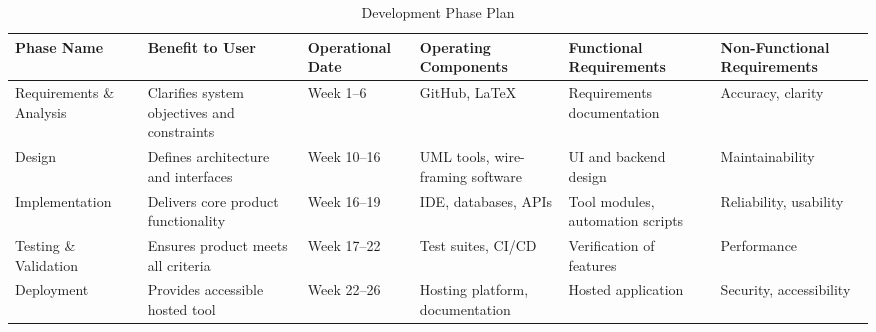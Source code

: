 \documentclass[12pt]{article}
\newcommand{\lips}{\textit{Insert your content here.}}
\begin{document}
\begin{table}[H]
\centering
\caption{Development Phase Plan}
\begin{tabularx}{\textwidth}{|p{2.5cm}|X|p{2cm}|X|X|X|}
\hline
\textbf{Phase Name} & \textbf{Benefit to User} & \textbf{Operational Date} & \textbf{Operating Components} & \textbf{Functional Requirements} & \textbf{Non-Functional Requirements} \\ \hline
Requirements \& Analysis & Clarifies system objectives and constraints & Week 1–6 & GitHub, LaTeX & Requirements documentation & Accuracy, clarity \\ \hline
Design & Defines architecture and interfaces & Week 10–16 & UML tools, wire-framing software & UI and backend design & Maintainability \\ \hline
Implementation & Delivers core product functionality & Week 16–19 & IDE, databases, APIs & Tool modules, automation scripts & Reliability, usability \\ \hline
Testing \& Validation & Ensures product meets all criteria & Week 17–22 & Test suites, CI/CD & Verification of features & Performance \\ \hline
Deployment & Provides accessible hosted tool & Week 22–26 & Hosting platform, documentation & Hosted application & Security, accessibility \\ \hline
\end{tabularx}
\end{table}


\end{document}
